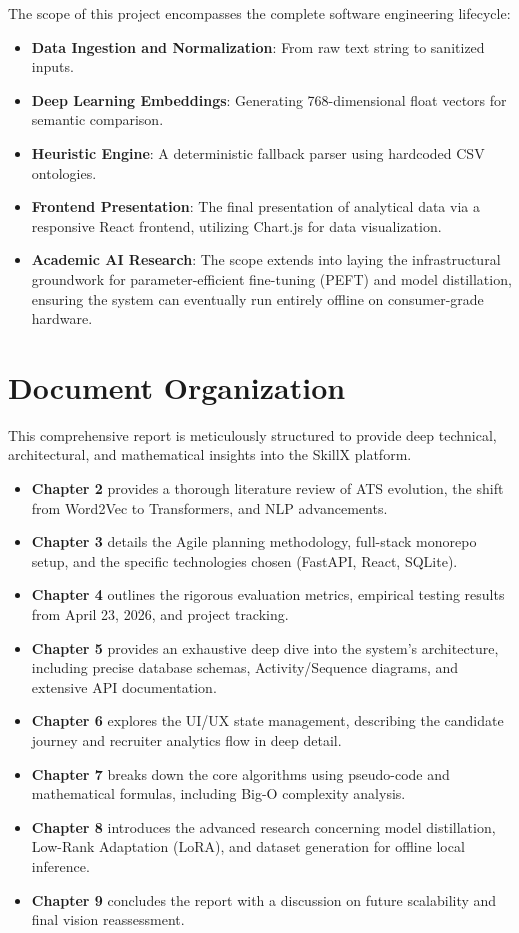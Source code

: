 \documentclass[12pt,a4paper]{report}
\begin{document}
The scope of this project encompasses the complete software engineering lifecycle:
\begin{itemize}
    \item \textbf{Data Ingestion and Normalization}: From raw text string to sanitized inputs.
    \item \textbf{Deep Learning Embeddings}: Generating 768-dimensional float vectors for semantic comparison.
    \item \textbf{Heuristic Engine}: A deterministic fallback parser using hardcoded CSV ontologies.
    \item \textbf{Frontend Presentation}: The final presentation of analytical data via a responsive React frontend, utilizing Chart.js for data visualization.
    \item \textbf{Academic AI Research}: The scope extends into laying the infrastructural groundwork for parameter-efficient fine-tuning (PEFT) and model distillation, ensuring the system can eventually run entirely offline on consumer-grade hardware.
\end{itemize}

\section{Document Organization}

This comprehensive report is meticulously structured to provide deep technical, architectural, and mathematical insights into the SkillX platform. 
\begin{itemize}
    \item \textbf{Chapter 2} provides a thorough literature review of ATS evolution, the shift from Word2Vec to Transformers, and NLP advancements. 
    \item \textbf{Chapter 3} details the Agile planning methodology, full-stack monorepo setup, and the specific technologies chosen (FastAPI, React, SQLite). 
    \item \textbf{Chapter 4} outlines the rigorous evaluation metrics, empirical testing results from April 23, 2026, and project tracking. 
    \item \textbf{Chapter 5} provides an exhaustive deep dive into the system's architecture, including precise database schemas, Activity/Sequence diagrams, and extensive API documentation. 
    \item \textbf{Chapter 6} explores the UI/UX state management, describing the candidate journey and recruiter analytics flow in deep detail. 
    \item \textbf{Chapter 7} breaks down the core algorithms using pseudo-code and mathematical formulas, including Big-O complexity analysis. 
    \item \textbf{Chapter 8} introduces the advanced research concerning model distillation, Low-Rank Adaptation (LoRA), and dataset generation for offline local inference.
    \item \textbf{Chapter 9} concludes the report with a discussion on future scalability and final vision reassessment.
\end{itemize}
\end{document}
